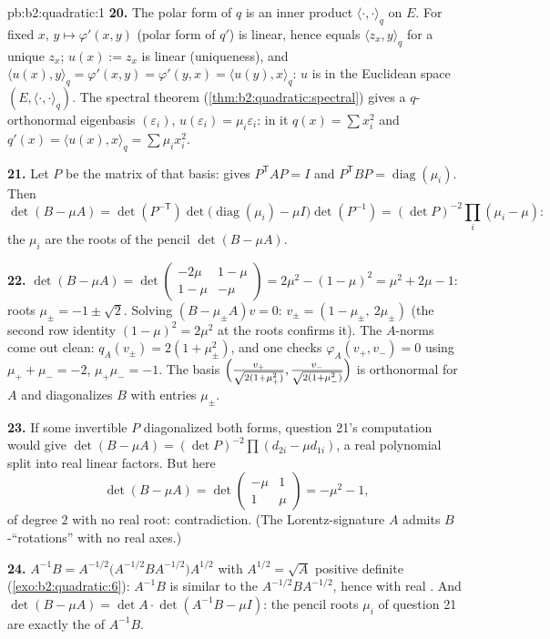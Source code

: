 \begin{solution}{pb:b2:quadratic:1}
\textbf{20.} The polar form of $q$ is an inner product
$\langle\cdot,\cdot\rangle_q$ on $E$. For fixed $x$, $y \mapsto
\varphi'(x, y)$ (polar form of $q'$) is linear, hence equals
$\langle z_x, y\rangle_q$ for a unique $z_x$; $u(x) := z_x$ is
linear (uniqueness), and $\langle u(x), y\rangle_q =
\varphi'(x,y) = \varphi'(y,x) = \langle u(y), x\rangle_q$: $u$
is  in the Euclidean space $(E,
\langle\cdot,\cdot\rangle_q)$. The spectral theorem
(\cref{thm:b2:quadratic:spectral}) gives a $q$-orthonormal
eigenbasis $(\varepsilon_i)$, $u(\varepsilon_i) =
\mu_i\varepsilon_i$: in it $q(x) = \sum x_i^2$ and $q'(x) =
\langle u(x), x\rangle_q = \sum\mu_ix_i^2$.

\textbf{21.} Let $P$ be the matrix of that basis: 
gives $P^{\mathsf T}AP = I$ and $P^{\mathsf T}BP =
\operatorname{diag}(\mu_i)$. Then
\[
\det(B - \mu A) = \det(P^{-\mathsf T})
\det\bigl(\operatorname{diag}(\mu_i) - \mu I\bigr)
\det(P^{-1})
= (\det P)^{-2}\prod_i(\mu_i - \mu) :
\]
the $\mu_i$ are the roots of the pencil $\det(B - \mu A)$.

\textbf{22.} $\det(B - \mu A) =
\det\begin{pmatrix} -2\mu & 1-\mu\\ 1-\mu & -\mu\end{pmatrix}
= 2\mu^2 - (1-\mu)^2 = \mu^2 + 2\mu - 1$: roots $\mu_\pm = -1
\pm \sqrt2$. Solving $(B - \mu_\pm A)v = 0$: $v_\pm = (1 -
\mu_\pm,\ 2\mu_\pm)$ (the second row identity $(1-\mu)^2 =
2\mu^2$ at the roots confirms it). The $A$-norms come out
clean: $q_A(v_\pm) = 2(1 + \mu_\pm^2)$, and one checks
$\varphi_A(v_+, v_-) = 0$ using $\mu_+ + \mu_- = -2$,
$\mu_+\mu_- = -1$. The basis $\Bigl(\frac{v_+}{\sqrt{2(1 +
\mu_+^2)}}, \frac{v_-}{\sqrt{2(1+\mu_-^2)}}\Bigr)$ is
orthonormal for $A$ and diagonalizes $B$ with entries
$\mu_\pm$.

\textbf{23.} If some invertible $P$ diagonalized both forms,
question 21's computation would give $\det(B - \mu A) = (\det
P)^{-2}\prod(d_{2i} - \mu d_{1i})$, a real polynomial split
into real linear factors. But here
\[
\det(B - \mu A) = \det\begin{pmatrix} -\mu & 1\\ 1 &
\mu\end{pmatrix} = -\mu^2 - 1 ,
\]
of degree $2$ with no real root: contradiction. (The
Lorentz-signature $A$ admits $B$-``rotations'' with no real
axes.)

\textbf{24.} $A^{-1}B = A^{-1/2}\bigl(A^{-1/2}BA^{-1/2}\bigr)
A^{1/2}$ with $A^{1/2} = \sqrt A$ positive definite
(\cref{exo:b2:quadratic:6}): $A^{-1}B$ is similar to the
\emph{} $A^{-1/2}BA^{-1/2}$, hence  with
real . And $\det(B - \mu A) = \det A\cdot
\det(A^{-1}B - \mu I)$: the pencil roots $\mu_i$ of question
21 are exactly the  of $A^{-1}B$.


\end{solution}
